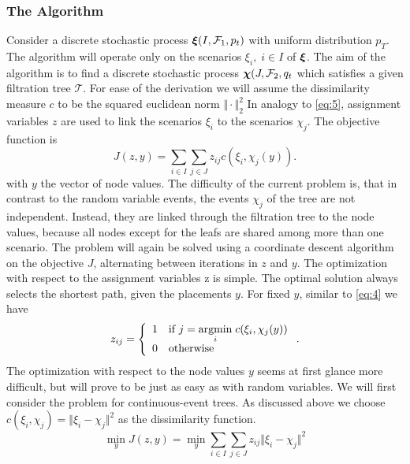 \subsubsection{The Algorithm}
\label{sec:k-means-for-trees-alg}
Consider a discrete stochastic process $\boldsymbol\xi(I, \mathcal{F}_1, p_t)$ with uniform distribution $p_T$.
The algorithm will operate only on the scenarios $\xi_i,\; i\in I$ of $\boldsymbol\xi$.
The aim of the algorithm is to find a discrete stochastic process $\boldsymbol\chi(J, \mathcal{F}_2,q_t$ which satisfies a given filtration tree $\mathcal{T}$.
For ease of the derivation we will assume the dissimilarity measure $c$ to be the squared euclidean norm $\Vert\cdot\Vert_2^2$
In analogy to \eqref{eq:5}, assignment variables $z$ are used to link the scenarios $\xi_i$ to the scenarios $\chi_j$.
The objective function is
\begin{equation}
  \label{eq:8}
  J(z, y) = \sum_{i\in I}\sum_{j\in J}z_{ij}c(\xi_i, \chi_j(y)).
\end{equation}
with $y$ the vector of  node values.
The difficulty of the current problem is, that in contrast to the random variable events, the events $\chi_j$ of the tree are not independent.
Instead, they are linked through the filtration tree to the node values, because all nodes except for the leafs are shared among more than one scenario.
The problem will again be solved using a coordinate descent algorithm on the objective $J$, alternating between iterations in $z$ and $y$.
The optimization with respect to the assignment variables z is simple.
The optimal solution always selects the shortest path, given the placements $y$.
For fixed $y$, similar to \eqref{eq:4} we have
\begin{equation}
  \label{eq:10}
  z_{ij} = \left\{\begin{array}{ll}1&\text{if }j=\underset{i}{\operatorname{argmin}}\; c(\xi_i,\chi_j(y))\\0&\text{otherwise} \end{array}\right. .
\end{equation}
The optimization with respect to the node values $y$ seems at first glance more difficult, but will prove to be just as easy as with random variables.
We will first consider the problem for continuous-event trees.
As discussed above we choose $c(\xi_i, \chi_j) = \Vert \xi_i-\chi_j\Vert^2$ as the dissimilarity function.
\begin{equation}
  \label{eq:11}
  \min\limits_y J(z,y) = \min\limits_y \sum_{i\in I}\sum_{j\in J}z_{ij}\Vert \xi_i - \chi_j\Vert^2
\end{equation}
